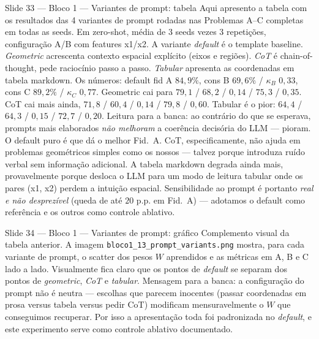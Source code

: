 \documentclass[aspectratio=169,10pt]{beamer}
\begin{document}
\begin{frame}{Slide 33 --- Bloco 1 --- Variantes de prompt: tabela}
\footnotesize
Aqui apresento a tabela com os resultados das 4 variantes de prompt rodadas nas Problemas A--C completas em todas as seeds. Em zero-shot, m\'edia de 3 seeds vezes 3 repeti\c{c}\~oes, configura\c{c}\~ao A/B com features x1/x2. A variante \emph{default} \'e o template baseline. \emph{Geometric} acrescenta contexto espacial expl\'icito (eixos e regi\~oes). \emph{CoT} \'e chain-of-thought, pede racioc\'inio passo a passo. \emph{Tabular} apresenta as coordenadas em tabela markdown. Os n\'umeros: default fid A $84{,}9\%$, cons B $69{,}6\%$ / $\kappa_B$ $0{,}33$, cons C $89{,}2\%$ / $\kappa_C$ $0{,}77$. Geometric cai para $79{,}1$ / $68{,}2$ / $0{,}14$ / $75{,}3$ / $0{,}35$. CoT cai mais ainda, $71{,}8$ / $60{,}4$ / $0{,}14$ / $79{,}8$ / $0{,}60$. Tabular \'e o pior: $64{,}4$ / $64{,}3$ / $0{,}15$ / $72{,}7$ / $0{,}20$. Leitura para a banca: ao contr\'ario do que se esperava, prompts mais elaborados \emph{n\~ao melhoram} a coer\^encia decis\'oria do LLM --- pioram. O default puro \'e que d\'a o melhor Fid.\ A. CoT, especificamente, n\~ao ajuda em problemas geom\'etricos simples como os nossos --- talvez porque introduza ru\'ido verbal sem informa\c{c}\~ao adicional. A tabela markdown degrada ainda mais, provavelmente porque desloca o LLM para um modo de leitura tabular onde os pares (x1, x2) perdem a intui\c{c}\~ao espacial. Sensibilidade ao prompt \'e portanto \emph{real e n\~ao desprez\'ivel} (queda de at\'e $20$ p.p. em Fid.\ A) --- adotamos o default como refer\^encia e os outros como controle ablativo.
\end{frame}

\begin{frame}{Slide 34 --- Bloco 1 --- Variantes de prompt: gr\'afico}
\footnotesize
Complemento visual da tabela anterior. A imagem \texttt{bloco1\_13\_prompt\_variants.png} mostra, para cada variante de prompt, o scatter dos pesos $W$ aprendidos e as m\'etricas em A, B e C lado a lado. Visualmente fica claro que os pontos de \emph{default} se separam dos pontos de \emph{geometric}, \emph{CoT} e \emph{tabular}. Mensagem para a banca: a configura\c{c}\~ao do prompt n\~ao \'e neutra --- escolhas que parecem inocentes (passar coordenadas em prosa versus tabela versus pedir CoT) modificam mensuravelmente o $W$ que conseguimos recuperar. Por isso a apresenta\c{c}\~ao toda foi padronizada no \emph{default}, e este experimento serve como controle ablativo documentado.
\end{frame}
\end{document}
